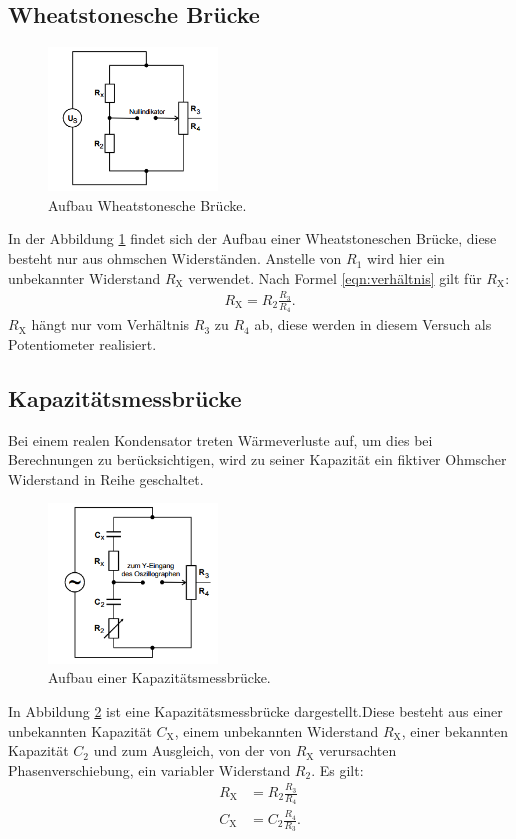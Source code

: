\subsection{Wheatstonesche Brücke}
\begin{figure}
 \centering
 \includegraphics[width=0.4\textwidth]{wheat.PNG}
 \caption{Aufbau Wheatstonesche Brücke.}
 \label{fig:wheat}
 \end{figure}
In der Abbildung \ref{fig:wheat} findet sich der Aufbau einer Wheatstoneschen Brücke, diese besteht nur aus ohmschen Widerständen.
Anstelle von $R_\mathrm{1}$ wird hier ein unbekannter Widerstand $R_\mathrm{X}$ verwendet.
Nach Formel \eqref{eqn:verhältnis} gilt für $R_\mathrm{X}$:
\begin{align}
  R_\mathrm{X}=R_\mathrm{2}\frac{R_\mathrm{3}}{R_\mathrm{4}}.
\end{align}
$R_\mathrm{X}$ hängt nur vom Verhältnis $R_\mathrm{3}$ zu $R_\mathrm{4}$ ab, diese werden in diesem Versuch als Potentiometer realisiert.\\
\subsection{Kapazitätsmessbrücke}
Bei einem realen Kondensator treten Wärmeverluste auf, um dies bei Berechnungen zu berücksichtigen, wird zu seiner Kapazität ein fiktiver Ohmscher Widerstand in Reihe geschaltet.
\begin{figure}
 \centering
 \includegraphics[width=0.4\textwidth]{kapazitaet.PNG}
 \caption{Aufbau einer Kapazitätsmessbrücke.}
 \label{fig:kapazitaet}
 \end{figure}
In Abbildung \ref{fig:kapazitaet} ist eine Kapazitätsmessbrücke dargestellt.Diese besteht aus einer unbekannten Kapazität $C_\mathrm{X}$,
einem unbekannten Widerstand $R_\mathrm{X}$, einer bekannten Kapazität $C_\mathrm{2}$ und zum Ausgleich, von der von $R_\mathrm{X}$ verursachten Phasenverschiebung,
ein variabler Widerstand $R_\mathrm{2}$.
Es gilt:
\begin{align}
  R_\mathrm{X}&=R_\mathrm{2}\frac{R_\mathrm{3}}{R_\mathrm{4}}\\
  C_\mathrm{X}&=C_\mathrm{2}\frac{R_\mathrm{4}}{R_\mathrm{3}}.
\end{align}\\
